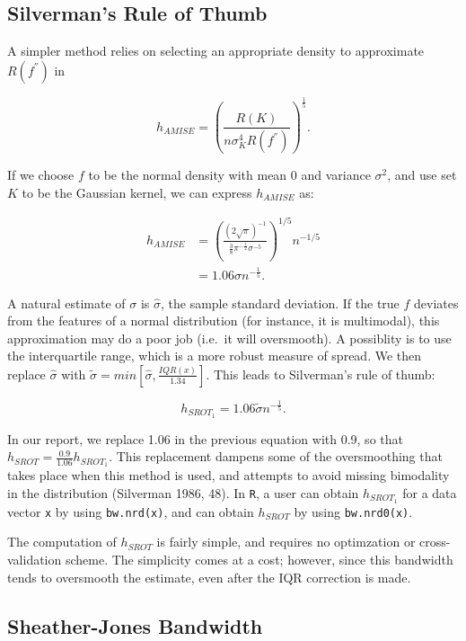 \documentclass[]{article}
\begin{document}
\subsection{Silverman's Rule of Thumb}\label{silvermans-rule-of-thumb}

A simpler method relies on selecting an appropriate density to
approximate \(R(f^{''})\) in

\[
h_{AMISE} = \left(\frac{R(K)}{n\sigma_K^4R(f^{''})}\right)^{\frac{1}{5}}.
\]

If we choose \(f\) to be the normal density with mean 0 and variance
\(\sigma^2\), and use set \(K\) to be the Gaussian kernel, we can
express \(h_{AMISE}\) as:

\[
\begin{aligned}
h_{AMISE} &= \left(\frac{(2\sqrt{\pi})^{-1}}{\frac{3}{8}\pi^{-\frac{1}{2}}\sigma^{-5}}\right)^{1/5} n^{-1/5} \\
&= 1.06\sigma n^{-\frac{1}{5}}.
\end{aligned}
\]

A natural estimate of \(\sigma\) is \(\hat{\sigma}\), the sample
standard deviation. If the true \(f\) deviates from the features of a
normal distribution (for instance, it is multimodal), this approximation
may do a poor job (i.e.~it will oversmooth). A possiblity is to use the
interquartile range, which is a more robust measure of spread. We then
replace \(\hat{\sigma}\) with
\(\tilde{\sigma} = min\left[\hat{\sigma}, \frac{IQR(x)}{1.34}\right]\).
This leads to Silverman's rule of thumb:

\[
h_{SROT_1} = 1.06 \tilde{\sigma} n ^ {-\frac{1}{5}}.
\]

In our report, we replace 1.06 in the previous equation with 0.9, so
that \(h_{SROT} = \frac{0.9}{1.06} h_{SROT_1}\). This replacement
dampens some of the oversmoothing that takes place when this method is
used, and attempts to avoid missing bimodality in the distribution
(Silverman 1986, 48). In \texttt{R}, a user can obtain \(h_{SROT_1}\)
for a data vector \texttt{x} by using \texttt{bw.nrd(x)}, and can obtain
\(h_{SROT}\) by using \texttt{bw.nrd0(x)}.

The computation of \(h_{SROT}\) is fairly simple, and requires no
optimzation or cross-validation scheme. The simplicity comes at a cost;
however, since this bandwidth tends to oversmooth the estimate, even
after the IQR correction is made.

\subsection{Sheather-Jones Bandwidth}\label{sheather-jones-bandwidth}
\end{document}
